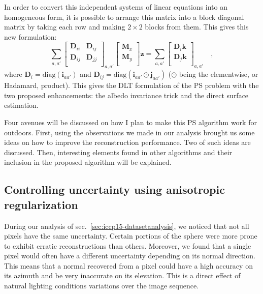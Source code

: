 In order to convert this independent systems of linear equations into an homogeneous form, it is possible to arrange this matrix into a block diagonal matrix by taking each row and making $2 \times 2$ blocks from them.
This gives this new formulation:
\begin{equation}
\sum_{a,a'}
\begin{bmatrix}
    \mathbf{D}_{ii} & \mathbf{D}_{ij} \\
    \mathbf{D}_{ij} & \mathbf{D}_{jj} \\
\end{bmatrix}_{a,a'}
\begin{bmatrix}
    \mathbf{M}_x \\
    \mathbf{M}_y \\
\end{bmatrix}
\mathbf{z} =
\sum_{a,a'}
\begin{bmatrix}
\mathbf{D}_i \mathbf{k} \\
\mathbf{D}_j \mathbf{k} \\
\end{bmatrix}_{a,a'}
\quad,
\end{equation}
where $\mathbf{D}_i = \mathrm{diag}(\mathbf{i}_{aa'})$ and $ \mathbf{D}_{ij} = \mathrm{diag}\left(\mathbf{i}_{aa'} \odot \mathbf{j}_{aa'}\right)$ ($\odot$ being the elementwise, or Hadamard, product). This gives the DLT formulation of the PS problem with the two proposed enhancements: the albedo invariance trick and the direct surface estimation.


Four avenues will be discussed on how I plan to make this PS algorithm work for outdoors. First, using the observations we made in our analysis brought us some ideas on how to improve the reconstruction performance. Two of such ideas are discussed. Then, interesting elements found in other algorithms and their inclusion in the proposed algorithm will be explained.

\subsection{Controlling uncertainty using anisotropic regularization}
\label{subsec:reg}

During our analysis of sec.~\ref{sec:iccp15-datasetanalysis}, we noticed that not all pixels have the same uncertainty. Certain portions of the sphere were more prone to exhibit erratic reconstructions than others. Moreover, we found that a single pixel would often have a different uncertainty depending on its normal direction. This means that a normal recovered from a pixel could have a high accuracy on its azimuth and be very inaccurate on its elevation. This is a direct effect of natural lighting conditions variations over the image sequence.

